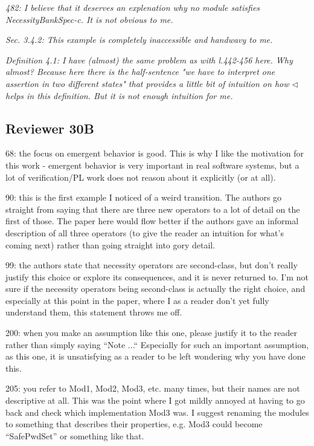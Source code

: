 \documentclass[11pt]{amsart}
\newcommand{\rev}[1]{\emph #1}
\begin{document}
{\rev {{482: I believe that it deserves an explenation why no module satisfies NecessityBankSpec-c. It is not obvious to me. }}}

{\rev {{Sec. 3.4.2: This example is completely inaccessible and handwavy to me. }}}

{\rev {{ Definition 4.1: I have (almost) the same problem as with l.442-456 here. Why almost? Because here there is the half-sentence "we have to interpret one assertion in two different states" that provides a little bit of intuition on how $\triangleleft$ helps in this definition. But it is not enough intuition for me. }}}

   
  \subsection*{Reviewer 30B}
  
   68: the focus on emergent behavior is good. This is why I like the motivation for this work - emergent behavior is very important in real software systems, but a lot of verification/PL work does not reason about it explicitly (or at all).

90: this is the first example I noticed of a weird transition. The authors go straight from saying that there are three new operators to a lot of detail on the first of those. The paper here would flow better if the authors gave an informal description of all three operators (to give the reader an intuition for what’s coming next) rather than going straight into gory detail.

99: the authors state that necessity operators are second-class, but don’t really justify this choice or explore its consequences, and it is never returned to. I’m not sure if the necessity operators being second-class is actually the right choice, and especially at this point in the paper, where I as a reader don’t yet fully understand them, this statement throws me off.

200: when you make an assumption like this one, please justify it to the reader rather than simply saying “Note ...“ Especially for such an important assumption, as this one, it is unsatisfying as a reader to be left wondering why you have done this.

205: you refer to Mod1, Mod2, Mod3, etc. many times, but their names are not descriptive at all. This was the point where I got mildly annoyed at having to go back and check which implementation Mod3 was. I suggest renaming the modules to something that describes their properties, e.g. Mod3 could become “SafePwdSet” or something like that.
\end{document}
